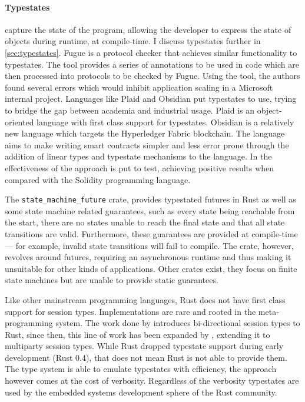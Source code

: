 \paragraph{Typestates} capture the state of the program,
allowing the developer to express the state of objects during runtime, at compile-time. %
I discuss typestates further in \autoref{sec:typestates}.
Fugue \autocite{DeLine2004} is a protocol checker that achieves similar functionality to typestates.
The tool provides a series of annotations to be used in code which are then processed into protocols to be checked by Fugue.
Using the tool, the authors found several errors which would inhibit application scaling in a Microsoft internal project.
Languages like Plaid \autocite{Aldrich2009} and Obsidian \autocite{Coblenz2020, Coblenz2020a} put typestates to use,
trying to bridge the gap between academia and industrial usage.
Plaid is an object-oriented language with first class support for typestates.
Obsidian is a relatively new language which targets the Hyperledger Fabric blockchain.
The language aims to make writing smart contracts simpler and less error prone
through the addition of linear types and typestate mechanisms to the language.
In \autocite{Coblenz2020} the effectiveness of the approach is put to test,
achieving positive results when compared with the Solidity programming language.

The \texttt{state\_machine\_future} crate, provides typestated futures in Rust as well as some state machine related guarantees,
such as every state being reachable from the start,
there are no states unable to reach the final state and that all state transitions are valid.
Furthermore, these guarantees are provided at compile-time --- for example, invalid state transitions will fail to compile.
The crate, however, revolves around futures, requiring an asynchronous runtime and thus making it unsuitable for other kinds of applications.
Other crates exist, they focus on finite state machines but are unable to provide static guarantees.

Like other mainstream programming languages, Rust does not have first class support for session types.
Implementations are rare and rooted in the meta-programming system.
The work done by \autocite{Jespersen2015} introduces bi-directional session types to Rust,
since then, this line of work has been expanded by \autocite{Lagaillardie2020}, extending it to multiparty session types.
While Rust dropped typestate support during early development (Rust 0.4), that does not mean Rust is not able to provide them.
The type system is able to emulate typestates with efficiency, the approach however comes at the cost of verbosity.
Regardless of the verbosity typestates are used by the embedded systems development sphere of the Rust community.



